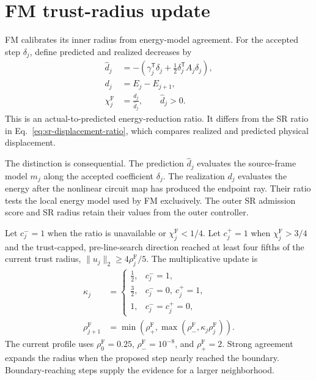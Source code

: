 \documentclass[10pt,twocolumn]{article}
\begin{document}
\section*{FM trust-radius update}

FM calibrates its inner radius from energy-model agreement. For the accepted
step \(\delta_j\), define predicted and realized decreases by
\begin{align}
\widehat d_j
&=-\left(\gamma_j^{\mathsf T}\delta_j
+\tfrac12\delta_j^{\mathsf T}A_j\delta_j\right),
\nonumber\\
d_j&=E_j-E_{j+1},
\nonumber\\
\chi_j^{\mathrm F}&=\frac{d_j}{\widehat d_j},
\qquad \widehat d_j>0.
\label{eq:fm-agreement-ratio}
\end{align}
This is an actual-to-predicted energy-reduction ratio. It differs from the SR
ratio in Eq.~\eqref{eq:sr-displacement-ratio}, which compares realized and
predicted physical displacement.

The distinction is consequential. The prediction \(\widehat d_j\) evaluates
the source-frame model \(m_j\) along the accepted coefficient \(\delta_j\).
The realization \(d_j\) evaluates the energy after the nonlinear circuit map
has produced the endpoint ray. Their ratio tests the local energy model used by
FM exclusively. The outer SR admission score and SR radius retain their values
from the outer controller.

Let \(c_j^-=1\) when the ratio is unavailable or
\(\chi_j^{\mathrm F}<1/4\). Let \(c_j^+=1\) when
\(\chi_j^{\mathrm F}>3/4\) and the trust-capped, pre-line-search direction
reached at least four fifths of the current trust radius,
\(\|u_j\|_2\geq4\rho_j^{\mathrm F}/5\). The multiplicative update is
\begin{align}
\kappa_j&=
\begin{cases}
\tfrac12,&c_j^-=1,\\
\tfrac32,&c_j^-=0,\ c_j^+=1,\\
1,&c_j^-=c_j^+=0,
\end{cases}
\nonumber\\
\rho_{j+1}^{\mathrm F}
&=\min\!\left(\rho_+^{\mathrm F},
\max\!\left(\rho_-^{\mathrm F},
\kappa_j\rho_j^{\mathrm F}\right)\right).
\label{eq:fm-trust-update}
\end{align}
The current profile uses
\(\rho_0^{\mathrm F}=0.25\),
\(\rho_-^{\mathrm F}=10^{-8}\), and
\(\rho_+^{\mathrm F}=2\). Strong agreement expands the radius when the proposed
step nearly reached the boundary. Boundary-reaching steps supply the evidence
for a larger neighborhood.
\end{document}
